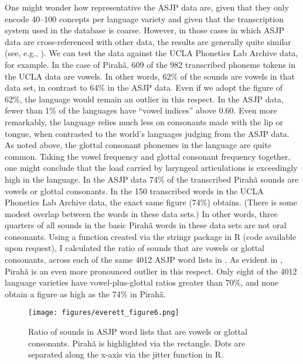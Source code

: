 \documentclass[output=paper,colorlinks,citecolor=brown
]{langscibook}
\begin{document}
    One might wonder how representative the ASJP data are, given that they only encode 40--100 concepts per language variety and given that the transcription system used in the database is coarse. However, in those cases in which ASJP data are cross-referenced with other data, the results are generally quite similar (see, e.g., \cite{everett2021speech}). We can test the data against the UCLA Phonetics Lab Archive data, for example. In the case of Pirahã, 609 of the 982 transcribed phoneme tokens in the UCLA data are vowels. In other words, 62\% of the sounds are vowels in that data set, in contrast to 64\% in the ASJP data. Even if we adopt the figure of 62\%, the language would remain an outlier in this respect. In the ASJP data, fewer than 1\% of the languages have “vowel indices” above 0.60.
    Even more remarkably, the language relies much less on consonants made with the lip or tongue, when contrasted to the world’s languages judging from the ASJP data. As noted above, the glottal consonant phonemes in the language are quite common. Taking the vowel frequency and glottal consonant frequency together, one might conclude that the load carried by laryngeal articulations is exceedingly high in the language. In the ASJP data 74\% of the transcribed Pirahã sounds are vowels or glottal consonants. In the 150 transcribed words in the UCLA Phonetics Lab Archive data, the exact same figure (74\%) obtains. (There is some modest overlap between the words in these data sets.) In other words, three quarters of all sounds in the basic Pirahã words in these data sets are not oral consonants. Using a function created via the stringr package in R (code available upon request), I calculated the ratio of sounds that are vowels or glottal consonants, across each of the same 4012 ASJP word lists in . As evident in , Pirahã is an even more pronounced outlier in this respect. Only eight of the 4012 language varieties have vowel-plus-glottal ratios greater than 70\%, and none obtain a figure as high as the 74\% in Pirahã.

\begin{figure}
\centering
\texttt{[image: figures/everett\_figure6.png]}
\caption{\label{everett-figure-6}Ratio of sounds in ASJP word lists that are vowels or glottal consonants. Pirahã is highlighted via the rectangle. Dots are separated along the x-axis via the jitter function in R. 
}

\end{figure}
\end{document}
